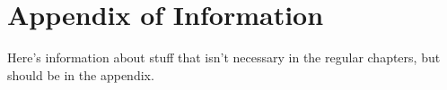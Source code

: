 
\chapter{Appendix of Information} %

\label{AppendixA} %


Here's information about stuff that isn't necessary in the regular chapters, but should be in the appendix.